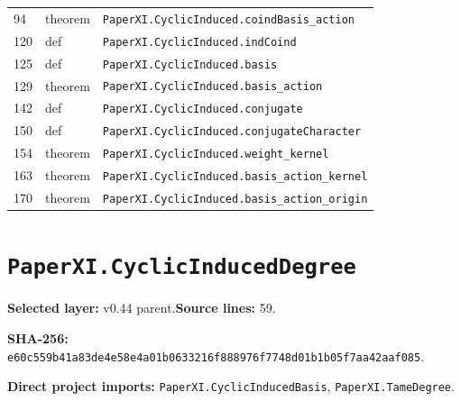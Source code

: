 \documentclass[10pt,oneside]{book}
\begin{document}
\begin{longtable}{@{}p{}p{}p{}@{}}
94&theorem&\nolinkurl{PaperXI.CyclicInduced.coindBasis_action}\\

120&def&\nolinkurl{PaperXI.CyclicInduced.indCoind}\\

125&def&\nolinkurl{PaperXI.CyclicInduced.basis}\\

129&theorem&\nolinkurl{PaperXI.CyclicInduced.basis_action}\\

142&def&\nolinkurl{PaperXI.CyclicInduced.conjugate}\\

150&def&\nolinkurl{PaperXI.CyclicInduced.conjugateCharacter}\\

154&theorem&\nolinkurl{PaperXI.CyclicInduced.weight_kernel}\\

163&theorem&\nolinkurl{PaperXI.CyclicInduced.basis_action_kernel}\\

170&theorem&\nolinkurl{PaperXI.CyclicInduced.basis_action_origin}\\

\bottomrule\end{longtable}

\section{\texorpdfstring{\nolinkurl{PaperXI.CyclicInducedDegree}}{PaperXI.CyclicInducedDegree}}\label{module:PaperXI.CyclicInducedDegree}

\textbf{Selected layer:} v0.44 parent.\quad\textbf{Source lines:} 59.\par\textbf{SHA-256:} {\scriptsize\nolinkurl{e60c559b41a83de4e58e4a01b0633216f888976f7748d01b1b05f7aa42aaf085}}.


\textbf{Direct project imports:} \nolinkurl{PaperXI.CyclicInducedBasis}, \nolinkurl{PaperXI.TameDegree}.
\end{document}
